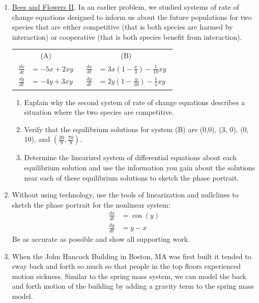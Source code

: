 \begin{enumerate}
\item \underline{Bees and Flowers II}. In an earlier problem, we studied systems of rate of change equations designed to inform us about the future populations for two species that are either competitive (that is both species are harmed by interaction) or cooperative (that is both species benefit from interaction). \label{15HWproblem1}

\begin{center}
\begin{tabular}{cc}
	 (A)	&	(B)	\\
$\displaystyle \begin{aligned} \frac{dx}{dt} &= -5x+2xy\\ \frac{dy}{dt} &= -4y+3xy \end{aligned}$ &$\displaystyle \begin{aligned} \frac{dx}{dt} &= 3x(1-\frac{x}{3})-\frac{1}{10}xy\\ \frac{dy}{dt} &= 2y(1-\frac{y}{10})-\frac{1}{5}xy \end{aligned}$ 
\end{tabular}
\end{center}

\begin{enumerate}
\item Explain why the second system of rate of change equations describes a situation where the two species are competitive. \label{15HWproblem1parta}
\item Verify that the equilibrium solutions for system (B) are (0,0), (3, 0), (0, 10), and $(\frac{20}{9},\frac{70}{9})$. \label{15HWproblem1partb}
\item Determine the linearized system of differential equations about each equilibrium solution and use the information you gain about the solutions near each of these equilibrium solutions to sketch the phase portrait. \label{15HWproblem1partc}
\end{enumerate}

\item Without using technology, use the tools of linearization and nullclines to sketch the phase portrait for the nonlinear system: \label{15HWproblem2}
\begin{align*}
\frac{dx}{dt} &=\cos(y) \\
\frac{dy}{dt} &=y-x
\end{align*}
Be as accurate as possible and show all supporting work.

\item When the John Hancock Building in Boston, MA was first built it tended to sway back and forth so much so that people in the top floors experienced motion sickness. Similar to the spring mass system, we can model the back and forth motion of the building by adding a gravity term to the spring mass model.
 

\end{enumerate}
